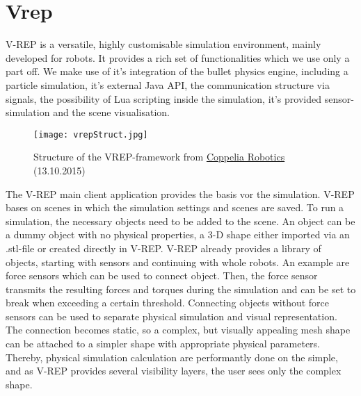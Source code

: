     \section{Vrep}
    \label{sec:theoryVrep}
    V-REP is a versatile, highly customisable simulation environment, mainly developed for robots. 
    It provides a rich set of functionalities which we use only a part off.  
    We make use of it's integration of the bullet physics engine, including a particle simulation, it's external Java API, the communication structure via signals, the possibility of Lua scripting inside the simulation, it's provided sensor-simulation and the scene visualisation.
    \begin{figure}[h!]
     \begin{center}
      \texttt{[image: vrepStruct.jpg]}
     \end{center}
      \caption{Structure of the VREP-framework from \href{http://www.coppeliarobotics.com/helpFiles/en/images/writingCode1.jpg}{Coppelia Robotics} (13.10.2015) \label{fig:vrepStruct}}
    \end{figure}
    
    The V-REP main client application provides the basis vor the simulation. 
    V-REP bases on scenes in which the simulation settings and scenes are saved. 
    To run a simulation, the necessary objects need to be added to the scene. 
    An object can be a dummy object with no physical properties, a 3-D shape either imported via an .stl-file or created directly in V-REP. 
    V-REP already provides a library of objects, starting with sensors and continuing with whole robots. 
    An example are force sensors which can be used to connect object. 
    Then, the force sensor transmits the resulting forces and torques during the simulation and can be set to break when exceeding a certain threshold. 
    Connecting objects without force sensors can be used to separate physical simulation and visual representation. 
    The connection becomes static, so a complex, but visually appealing mesh shape can be attached to a simpler shape with appropriate physical parameters. 
    Thereby, physical simulation calculation are performantly done on the simple, and as V-REP provides several visibility layers, the user sees only the complex shape.
    
